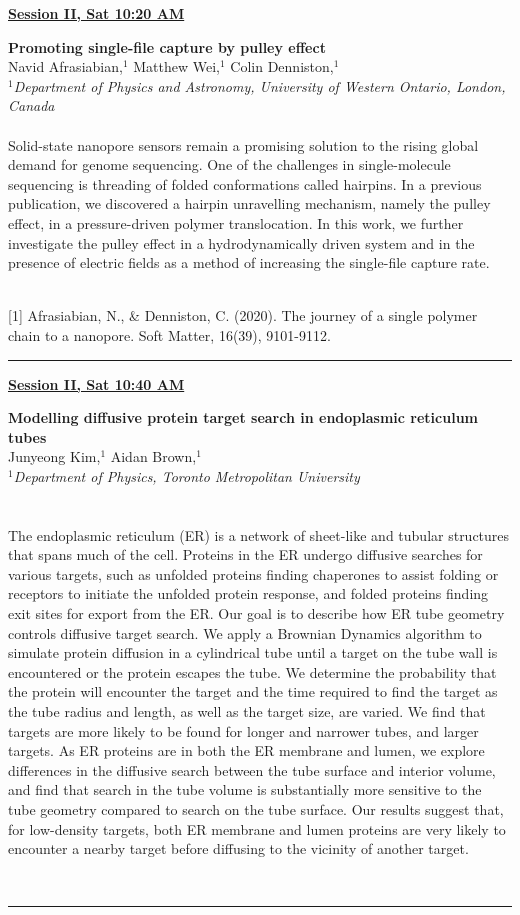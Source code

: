 \documentclass[titlepage,oneside,openany,10pt]{book}
\newenvironment{oralabswref}[5] %
        {
        \newcommand{\oralref}{#5}
        \begin{flushright}
                \underline{\textbf{#4}}
        \end{flushright}
        \textbf{#1}\\%
        #2\\%
        \textit{#3}\\\\%
        }
        {
        \vspace{0.5cm}
        \\\noindent \oralref \\ \noindent\rule{15cm}{0.5pt}%
        }
\newenvironment{oralabs}[4] %
        {
        \begin{flushright}
                \underline{\textbf{#4}}
        \end{flushright}
        \textbf{#1}\\%
        #2\\%
        \textit{#3}\\\\%
        }
        {
        \\
        \noindent\rule{15cm}{0.5pt}%
        }
\begin{document}
\begin{oralabswref}
	{Promoting single-file capture by pulley effect}
	{Navid Afrasiabian,$^{1}$ Matthew Wei,$^{1}$ Colin Denniston,$^{1}$}
	{
	$^1$Department of Physics and Astronomy, University of Western Ontario, London, Canada
	}
	{Session II, Sat 10:20 AM}
	{
	{[1]} Afrasiabian, N., \& Denniston, C. (2020). The journey of a single polymer chain to a nanopore. Soft Matter, 16(39), 9101-9112.
	}
	Solid-state nanopore sensors remain a promising solution to the rising global demand for genome sequencing. One of the challenges in single-molecule sequencing is threading of folded conformations called hairpins. In a previous publication, we discovered a hairpin unravelling mechanism, namely the pulley effect, in a pressure-driven polymer translocation. In this work, we further investigate the pulley effect in a hydrodynamically driven system and in the presence of electric fields as a method of increasing the single-file capture rate.
	\label{AfrasiabianN}
\end{oralabswref}

\vspace{1cm}

\begin{oralabs}
    {Modelling diffusive protein target search in endoplasmic reticulum tubes}
    {Junyeong Kim,$^{1}$ Aidan Brown,$^{1}$}
    {
    $^1$Department of Physics, Toronto Metropolitan University\\
    }
    {Session II, Sat 10:40 AM}
    The endoplasmic reticulum (ER) is a network of sheet-like and tubular structures that spans much of the cell. Proteins in the ER undergo diffusive searches for various targets, such as unfolded proteins finding chaperones to assist folding or receptors to initiate the unfolded protein response, and folded proteins finding exit sites for export from the ER. Our goal is to describe how ER tube geometry controls diffusive target search. We apply a Brownian Dynamics algorithm to simulate protein diffusion in a cylindrical tube until a target on the tube wall is encountered or the protein escapes the tube. We determine the probability that the protein will encounter the target and the time required to find the target as the tube radius and length, as well as the target size, are varied. We find that targets are more likely to be found for longer and narrower tubes, and larger targets. As ER proteins are in both the ER membrane and lumen, we explore differences in the diffusive search between the tube surface and interior volume, and find that search in the tube volume is substantially more sensitive to the tube geometry compared to search on the tube surface. Our results suggest that, for low-density targets, both ER membrane and lumen proteins are very likely to encounter a nearby target before diffusing to the vicinity of another target.
    \label{KimJ}
\end{oralabs}
\end{document}
